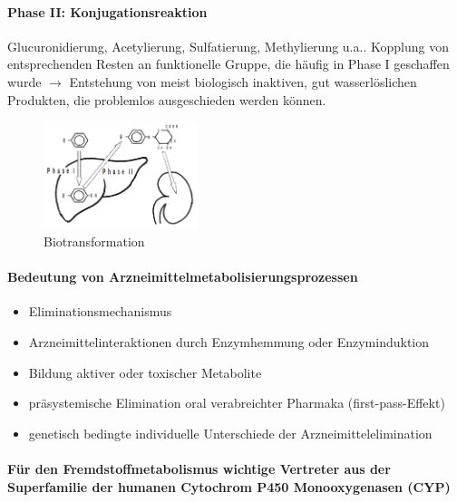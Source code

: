 \documentclass[10pt,a4paper]{report}
\begin{document}
\paragraph{Phase II: Konjugationsreaktion}
Glucuronidierung, Acetylierung, Sulfatierung, Methylierung u.a.. Kopplung von entsprechenden Resten an funktionelle Gruppe, die häufig in Phase I geschaffen wurde $\rightarrow$ Entstehung von meist biologisch inaktiven, gut wasserlöslichen Produkten, die problemlos ausgeschieden werden können.
\begin{figure}[h]
	\centering 
	\includegraphics[width=0.4\textwidth]{Biotransformation.png} 
	\caption{Biotransformation} 
	\label{fig:Biotransformation}
\end{figure}

\paragraph{Bedeutung von Arzneimittelmetabolisierungsprozessen}
\begin{itemize}
	\item Eliminationsmechanismus
	\item Arzneimittelinteraktionen durch Enzymhemmung oder Enzyminduktion
	\item Bildung aktiver oder toxischer Metabolite
	\item präsystemische Elimination oral verabreichter Pharmaka (first-pass-Effekt)
	\item genetisch bedingte individuelle Unterschiede der Arzneimittelelimination
\end{itemize}

\paragraph{Für den Fremdstoffmetabolismus wichtige Vertreter aus der Superfamilie der humanen Cytochrom P450 Monooxygenasen (CYP)} \mbox{}\\
\end{document}
